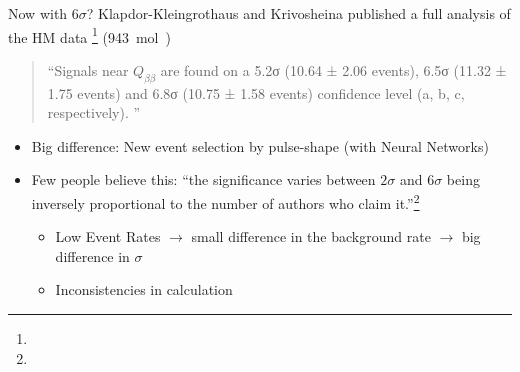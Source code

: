 \begin{frame}{Now with $6\sigma$?}
	Klapdor-Kleingrothaus and Krivosheina published a full analysis of the HM data \footnote{} (\SI{943}{\mole\year})
	\begin{quote}
		\enquote{Signals near $Q_{ββ}$ are found on a 5.2σ (10.64 ± 2.06 events), 6.5σ (11.32 ±
			1.75 events) and 6.8σ (10.75 ± 1.58 events) confidence level (a, b, c, respectively).
		}
	\end{quote}
	\vspace{-1em}
	\begin{itemize}
		\item Big difference: New event selection by pulse-shape (with Neural Networks)
		\item Few people believe this: \enquote{the significance varies between $2\sigma$ and $6\sigma$ being inversely proportional to the number of authors who claim it.}\footnote{}
			\begin{itemize}
			\item Low Event Rates $\rightarrow$ small difference in the background rate $\rightarrow$ big difference in $\sigma$\\
					\item Inconsistencies in calculation
	      \end{itemize}
	\end{itemize}
\end{frame}
